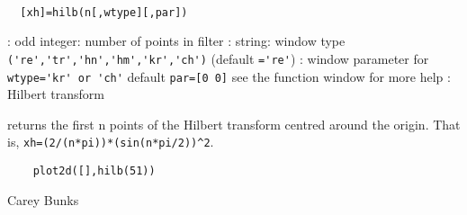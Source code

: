 
\begin{mandesc}
   \\ %
\end{mandesc}
\begin{calling_sequence}
\begin{verbatim}
  [xh]=hilb(n[,wtype][,par])  
\end{verbatim}
\end{calling_sequence}
\begin{parameters}
  \begin{varlist}
    : odd integer: number of points in filter
    : string: window type \verb!('re','tr','hn','hm','kr','ch')! (default \verb!='re'!)
    : window parameter for \verb!wtype='kr' or 'ch'! default \verb!par=[0 0]! see the function window for more help
    : Hilbert transform
  \end{varlist}
\end{parameters}
\begin{mandescription}
  returns the first n points of the
  Hilbert transform centred around the origin.
  That is, \verb!xh=(2/(n*pi))*(sin(n*pi/2))^2!.
\end{mandescription}
\begin{examples}
  \begin{Verbatim}
    plot2d([],hilb(51))
  \end{Verbatim}
\end{examples}
\begin{authors}
    Carey Bunks  
\end{authors}
